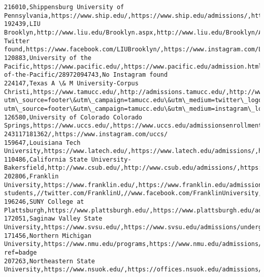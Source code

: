 \documentclass[11pt]{article}
\begin{document}
\begin{Verbatim}[commandchars=\\\{\}]
216010,Shippensburg University of Pennsylvania,https://www.ship.edu/,https://www.ship.edu/admissions/,http://twitter.com/shippensburgU,http://www.facebook.com/ShippensburgUniversity,https://www.instagram.com/shippensburguniv/
192439,LIU Brooklyn,http://www.liu.edu/Brooklyn.aspx,http://www.liu.edu/Brooklyn/Admissions,No Twitter found,https://www.facebook.com/LIUBrooklyn/,https://www.instagram.com/LIUBrooklyn/
120883,University of the Pacific,https://www.pacific.edu/,https://www.pacific.edu/admission.html,http://twitter.com/\#!/UOPacific,http://www.facebook.com/pages/University-of-the-Pacific/28972094743,No Instagram found
224147,Texas A \& M University-Corpus Christi,https://www.tamucc.edu/,http://admissions.tamucc.edu/,http://www.twitter.com/IslandCampus/?utm\_source=footer\&utm\_campaign=tamucc.edu\&utm\_medium=twitter\_logo,https://www.facebook.com/events/2419114411648601/,http://instagram.com/island\_university/?utm\_source=footer\&utm\_campaign=tamucc.edu\&utm\_medium=instagram\_logo
126580,University of Colorado Colorado Springs,https://www.uccs.edu/,https://www.uccs.edu/admissionsenrollment/,https://twitter.com/uccs,https://www.facebook.com/UCCS-243117181362/,https://www.instagram.com/uccs/
159647,Louisiana Tech University,https://www.latech.edu/,https://www.latech.edu/admissions/,http://twitter.com/latech,http://www.facebook.com/latech,https://www.instagram.com/louisianatech/
110486,California State University-Bakersfield,http://www.csub.edu/,http://www.csub.edu/admissions/,https://twitter.com/csubakersfield,http://www.facebook.com/csubakersfield,https://www.instagram.com/csubakersfield/
202806,Franklin University,https://www.franklin.edu/,https://www.franklin.edu/admissions/undergraduate-students,//twitter.com/FranklinU,//www.facebook.com/FranklinUniversity,//www.instagram.com/franklinuniv/
196246,SUNY College at Plattsburgh,https://www.plattsburgh.edu/,https://www.plattsburgh.edu/admissions/,https://twitter.com/sunyplattsburgh,https://www.facebook.com/sunyplattsburgh,https://www.instagram.com/sunyplattsburgh/
172051,Saginaw Valley State University,https://www.svsu.edu/,https://www.svsu.edu/admissions/undergraduate/,https://twitter.com/SVSU,https://www.facebook.com/svsu.edu,http://instagram.com/svsucardinals
171456,Northern Michigan University,https://www.nmu.edu/programs,https://www.nmu.edu/admissions/home,http://twitter.com/NorthernMichU,http://www.facebook.com/NorthernMichiganU,http://instagram.com/northernmichiganu?ref=badge
207263,Northeastern State University,https://www.nsuok.edu/,https://offices.nsuok.edu/admissions/AdmissionsHome.aspx,http://twitter.com/NSURiverhawks,https://www.facebook.com/NSURiverHawks,http://instagram.com/NSURiverhawks

\end{Verbatim}
\end{document}
